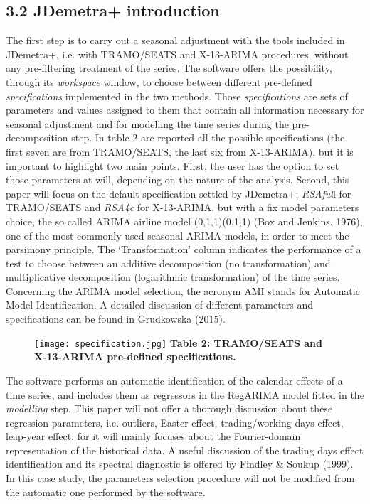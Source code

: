 \documentclass{article}
\begin{document}
\subsection*{\small 3.2 JDemetra+ introduction}
The first step is to carry out a seasonal adjustment with the tools included in JDemetra+, i.e. with TRAMO/SEATS and X-13-ARIMA procedures, without any pre-filtering treatment of the series. The software offers the possibility, through its \textit{workspace} window, to choose between different pre-defined \textit{specifications} implemented in the two methods. Those \textit{specifications} are sets of parameters and values assigned to them that contain all information necessary for seasonal adjustment and for modelling the time series during the pre-decomposition step. In table 2 are reported all the possible specifications (the first seven are from TRAMO/SEATS, the last six from X-13-ARIMA), but it is important to highlight two main points. First, the user has the option to set those parameters at will, depending on the nature of the analysis. Second, this paper will focus on the default specification settled by JDemetra+; \textit{RSAful}l for TRAMO/SEATS and \textit{RSA4c} for X-13-ARIMA, but with a fix model parameters choice, the so called ARIMA airline model (0,1,1)(0,1,1) (Box and Jenkins, 1976), one of the most commonly used seasonal ARIMA models, in order to meet the parsimony principle. The `Transformation' column indicates the performance of a test to choose between an additive decomposition (no transformation) and multiplicative decomposition (logarithmic transformation) of the time series. Concerning the ARIMA model selection, the acronym AMI stands for Automatic Model Identification. A detailed discussion of different parameters and specifications can be found in Grudkowska (2015).
\begin{figure}[H]
\centering
  \texttt{[image: specification.jpg]}
  {\textbf{\scriptsize Table 2: TRAMO/SEATS and X-13-ARIMA pre-defined specifications. }}
\end{figure}
The software performs an automatic identification of the calendar effects of a time series, and includes them as regressors in the RegARIMA model fitted in the \textit{modelling} step. This paper will not offer a thorough discussion about these regression parameters, i.e. outliers, Easter effect, trading/working days effect, leap-year effect; for it will mainly focuses about the Fourier-domain representation of the historical data. A useful discussion of the trading days effect identification and its spectral diagnostic is offered by Findley \& Soukup (1999). In this case study, the parameters selection procedure will not be modified from the automatic one performed by the software.
\end{document}

